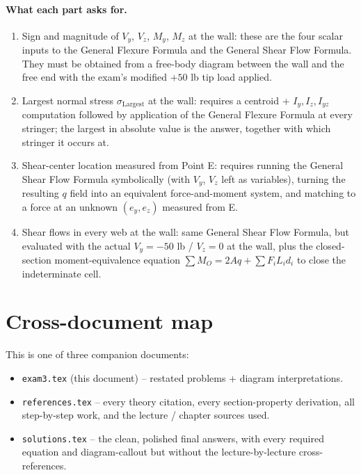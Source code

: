 \documentclass[11pt]{article}
\begin{document}
\paragraph{What each part asks for.}
\begin{enumerate}[label=(\alph*), leftmargin=2em, itemsep=1pt]
  \item Sign and magnitude of $V_y$, $V_z$, $M_y$, $M_z$ at the wall: these are the four scalar inputs to the General Flexure Formula and the General Shear Flow Formula. They must be obtained from a free-body diagram between the wall and the free end with the exam's modified $+50$ lb tip load applied.
  \item Largest normal stress $\sigma_{\text{Largest}}$ at the wall: requires a centroid + $I_y, I_z, I_{yz}$ computation followed by application of the General Flexure Formula at every stringer; the largest in absolute value is the answer, together with which stringer it occurs at.
  \item Shear-center location measured from Point E: requires running the General Shear Flow Formula symbolically (with $V_y$, $V_z$ left as variables), turning the resulting $q$ field into an equivalent force-and-moment system, and matching to a force at an unknown $(e_y, e_z)$ measured from E.
  \item Shear flows in every web at the wall: same General Shear Flow Formula, but evaluated with the actual $V_y = -50$ lb / $V_z = 0$ at the wall, plus the closed-section moment-equivalence equation $\sum M_O = 2A q + \sum F_i L_i d_i$ to close the indeterminate cell.
\end{enumerate}

\section*{Cross-document map}

This is one of three companion documents:
\begin{itemize}[leftmargin=2em, itemsep=1pt]
  \item \texttt{exam3.tex} (this document) -- restated problems + diagram interpretations.
  \item \texttt{references.tex} -- every theory citation, every section-property derivation, all step-by-step work, and the lecture / chapter sources used.
  \item \texttt{solutions.tex} -- the clean, polished final answers, with every required equation and diagram-callout but without the lecture-by-lecture cross-references.
\end{itemize}
\end{document}
